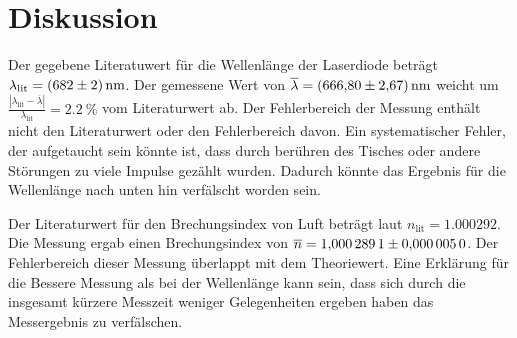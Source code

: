 \section{Diskussion}

Der gegebene Literatuwert für die Wellenlänge der Laserdiode beträgt $\lambda_\text{lit} = \qty{682 \pm 2}{\nm}$.
Der gemessene Wert von $\overline{\lambda} = \qty{666.80 \pm 2.67}{\nano\meter}$ weicht um 
$\frac{\left|\lambda_\text{lit} - \overline{\lambda}\right|}{\lambda_\text{lit}} = \qty{2.2}{\percent}$ vom Literaturwert ab.
Der Fehlerbereich der Messung enthält nicht den Literaturwert oder den Fehlerbereich davon.
Ein systematischer Fehler, der aufgetaucht sein könnte ist, dass durch berühren des Tisches oder andere Störungen zu viele Impulse gezählt wurden.
Dadurch könnte das Ergebnis für die Wellenlänge nach unten hin verfälscht worden sein.

Der Literaturwert für den Brechungsindex von Luft beträgt laut \cite{chemie_n} $n_\text{lit} = \num{1.000292}$.
Die Messung ergab einen Brechungsindex von $\overline{n} = \num{1.0002891 \pm 0.0000050}$.
Der Fehlerbereich dieser Messung überlappt mit dem Theoriewert. 
Eine Erklärung für die Bessere Messung als bei der Wellenlänge kann sein, dass sich durch die insgesamt kürzere Messzeit 
weniger Gelegenheiten ergeben haben das Messergebnis zu verfälschen.